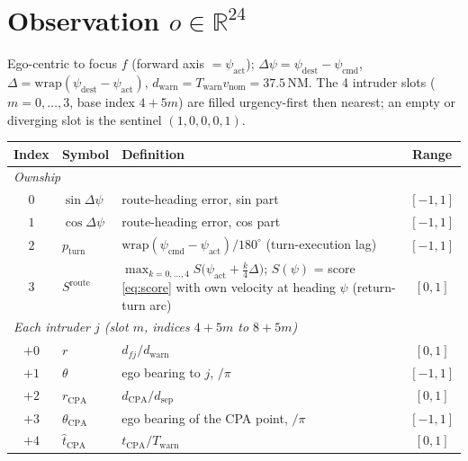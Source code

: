 \documentclass[11pt, a4paper]{article}
\begin{document}
\section{Observation $o\in\mathbb R^{24}$}
Ego-centric to focus $f$ (forward axis $=\psi_\text{act}$); $\Delta\psi=\psi_\text{dest}-\psi_\text{cmd}$,
$\Delta=\mathrm{wrap}(\psi_\text{dest}-\psi_\text{act})$, $d_\text{warn}=T_\text{warn}v_\text{nom}=37.5$\,NM.
The 4 intruder slots ($m=0,\dots,3$, base index $4+5m$) are filled urgency-first then nearest;
an empty or diverging slot is the sentinel $(1,0,0,0,1)$.
\begin{table}[h]\centering
\begin{tabular}{cllc}
\toprule
Index & Symbol & Definition & Range\\
\midrule
\multicolumn{4}{l}{\emph{Ownship}}\\
$0$ & $\sin\Delta\psi$ & route-heading error, sin part & $[-1,1]$\\
$1$ & $\cos\Delta\psi$ & route-heading error, cos part & $[-1,1]$\\
$2$ & $p_\text{turn}$ & $\mathrm{wrap}(\psi_\text{cmd}-\psi_\text{act})/180^\circ$ (turn-execution lag) & $[-1,1]$\\
$3$ & $S^\text{route}$ & $\displaystyle\max_{k=0,\dots,4} S\bigl(\psi_\text{act}+\tfrac{k}{4}\Delta\bigr)$; $S(\psi)$ = score \eqref{eq:score} with own velocity at heading $\psi$ (return-turn arc) & $[0,1]$\\
\multicolumn{4}{l}{\emph{Each intruder $j$ (slot $m$, indices $4{+}5m$ to $8{+}5m$)}}\\
$+0$ & $r$ & $d_{fj}/d_\text{warn}$ & $[0,1]$\\
$+1$ & $\theta$ & ego bearing to $j$, $/\pi$ & $[-1,1]$\\
$+2$ & $r_\text{CPA}$ & $d_\text{CPA}/d_\text{sep}$ & $[0,1]$\\
$+3$ & $\theta_\text{CPA}$ & ego bearing of the CPA point, $/\pi$ & $[-1,1]$\\
$+4$ & $\hat t_\text{CPA}$ & $t_\text{CPA}/T_\text{warn}$ & $[0,1]$\\
\bottomrule
\end{tabular}
\end{table}

\end{document}
